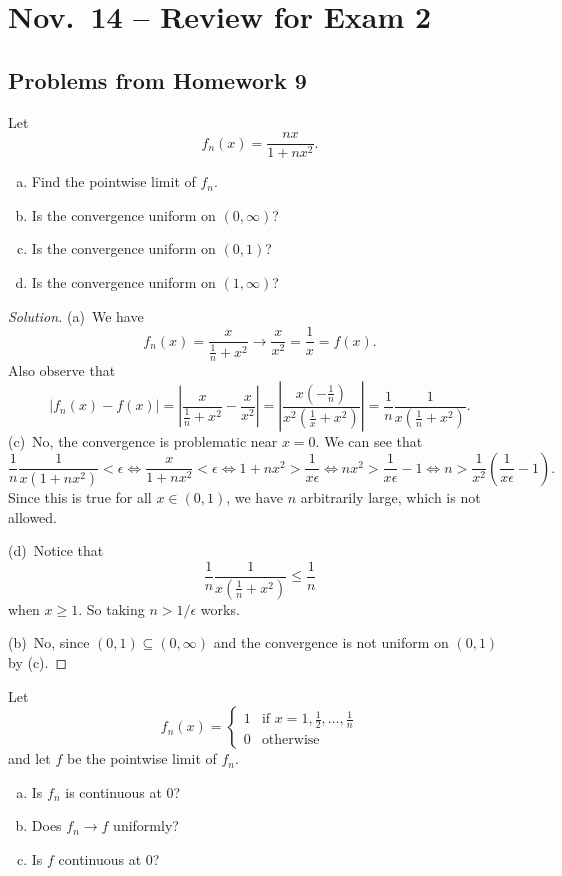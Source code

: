 \chapter{Nov.~14 -- Review for Exam 2}

\section{Problems from Homework 9}
\begin{exercise}[Abbott 6.2.1]
  Let
  \[
  f_n(x) = \frac{nx}{1 + nx^2}
  .\]
  \begin{enumerate}[(a)]
    \item Find the pointwise limit of $f_n$.
    \item Is the convergence uniform on $(0, \infty)$?
    \item Is the convergence uniform on $(0, 1)$?
    \item Is the convergence uniform on $(1, \infty)$?
  \end{enumerate}
\end{exercise}

\begin{proof}[Solution]
  (a)\, We have
  \[
    f_n(x) = \frac{x}{\frac{1}{n} + x^2} \to \frac{x}{x^2}
    = \frac{1}{x} = f(x).
  \]
  Also observe that
  \[
    |f_n(x) - f(x)|
    = \left|\frac{x}{\frac{1}{n} + x^2} - \frac{x}{x^2}\right|
    = \left|\frac{x(-\frac{1}{n})}{x^2 (\frac{1}{x} + x^2)}\right|
    = \frac{1}{n} \frac{1}{x(\frac{1}{n} + x^2)}.
  \]
  (c)\, No, the convergence is problematic near $x = 0$. We
  can see that
  \[
    \frac{1}{n}\frac{1}{x(1 + nx^2)} < \epsilon
    \iff \frac{x}{1 + nx^2} < \epsilon
    \iff 1 + nx^2 > \frac{1}{x\epsilon}
    \iff nx^2 > \frac{1}{x\epsilon} - 1
    \iff n > \frac{1}{x^2}\left(\frac{1}{x\epsilon} - 1\right).
  \]
  Since this is true for all $x \in (0, 1)$, we have
  $n$ arbitrarily large, which is not allowed.

  (d)\, Notice that
  \[
    \frac{1}{n} \frac{1}{x(\frac{1}{n} + x^2)}
    \le \frac{1}{n}
  \]
  when $x \ge 1$. So taking $n > 1 / \epsilon$
  works.

  (b)\, No, since $(0, 1) \subseteq (0, \infty)$ and
  the convergence is not uniform on $(0, 1)$ by
  (c).
\end{proof}

\begin{exercise}[Abbott 6.2.2]
  Let
  \[
    f_n(x) = \begin{cases}
      1 & \text{if } x = 1, \frac{1}{2}, \dots, \frac{1}{n} \\
      0 & \text{otherwise}
    \end{cases}
  \]
  and let $f$ be the pointwise limit of $f_n$.
  \begin{enumerate}[(a)]
    \item Is $f_n$ is continuous at $0$?
    \item Does $f_n \to f$ uniformly?
    \item Is $f$ continuous at $0$?
  \end{enumerate}
\end{exercise}

